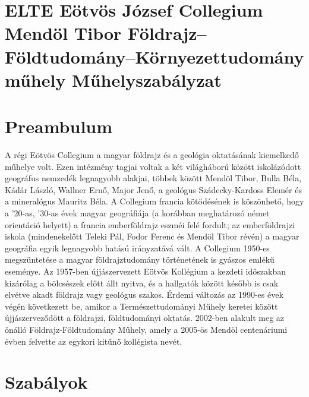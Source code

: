 \documentclass{../styles/rulebook}
\begin{document}
\section*{ELTE Eötvös József Collegium \\ Mendöl Tibor Földrajz--Földtudomány--Környezettudomány műhely\vspace{0.5em} Műhelyszabályzat} 

\vspace{2em}

\section*{Preambulum}
A régi Eötvös Collegium a magyar földrajz és a geológia oktatásának kiemelkedő műhelye volt. Ezen intézmény tagjai voltak a két világháború között iskolázódott geográfus nemzedék legnagyobb alakjai, többek között Mendöl Tibor, Bulla Béla, Kádár László, Wallner Ernő, Major Jenő, a geológus Szádecky-Kardoss Elemér és a mineralógus Mauritz Béla. A Collegium francia kötődésének is köszönhető, hogy a '20-as, '30-as évek magyar geográfiája (a korábban meghatározó német orientáció helyett) a francia emberföldrajz eszméi felé fordult; az emberföldrajzi iskola (mindenekelőtt Teleki Pál, Fodor Ferenc és Mendöl Tibor révén) a magyar geográfia egyik legnagyobb hatású irányzatává vált. A Collegium 1950-es megszüntetése a magyar földrajztudomány történetének is gyászos emlékű eseménye. Az 1957-ben újjászervezett Eötvös Kollégium a kezdeti időszakban kizárólag a bölcsészek előtt állt nyitva, és a hallgatók között később is csak elvétve akadt földrajz vagy geológus szakos. Érdemi változás az 1990-es évek végén következett be, amikor a Természettudományi Műhely keretei között újjászerveződött a földrajzi, földtudományi oktatás. 2002-ben alakult meg az önálló Földrajz-Földtudomány Műhely, amely a 2005-ös Mendöl centenáriumi évben felvette az egykori kitűnő kollégista nevét.


\section{Szabályok}
\end{document}
